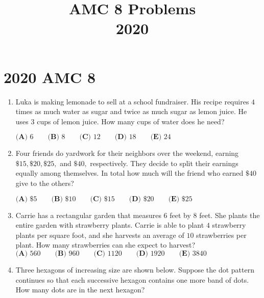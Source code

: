\documentclass{article}
\title{AMC 8 Problems \\ 2020}
\date{}
\begin{document}
\maketitle\thispagestyle{fancy}\newpage\section*{2020 AMC 8}
\begin{enumerate}[label=\arabic*., itemsep=0.5em]
\item Luka is making lemonade to sell at a school fundraiser. His recipe requires \(4\) times as much water as sugar and twice as much sugar as lemon juice. He uses \(3\) cups of lemon juice. How many cups of water does he need? 

\(\textbf{(A) } 6\qquad\textbf{(B) } 8\qquad\textbf{(C) } 12\qquad\textbf{(D) } 18\qquad\textbf{(E) } 24\qquad\)\par \vspace{0.5em}\item Four friends do yardwork for their neighbors over the weekend, earning \(\$15, \$20, \$25,\) and \(\$40,\) respectively. They decide to split their earnings equally among themselves. In total how much will the friend who earned \(\$40\) give to the others?

\(\textbf{(A) }\$5 \qquad \textbf{(B) }\$10 \qquad \textbf{(C) }\$15 \qquad \textbf{(D) }\$20 \qquad \textbf{(E) }\$25\)\par \vspace{0.5em}\item Carrie has a rectangular garden that measures \(6\) feet by \(8\) feet. She plants the entire garden with strawberry plants. Carrie is able to plant \(4\) strawberry plants per square foot, and she harvests an average of \(10\) strawberries per plant. How many strawberries can she expect to harvest?
\(\textbf{(A) }560 \qquad \textbf{(B) }960 \qquad \textbf{(C) }1120 \qquad \textbf{(D) }1920 \qquad \textbf{(E) }3840\)\par \vspace{0.5em}\item Three hexagons of increasing size are shown below. Suppose the dot pattern continues so that each successive hexagon contains one more band of dots. How many dots are in the next hexagon?



\end{enumerate}
\end{document}
